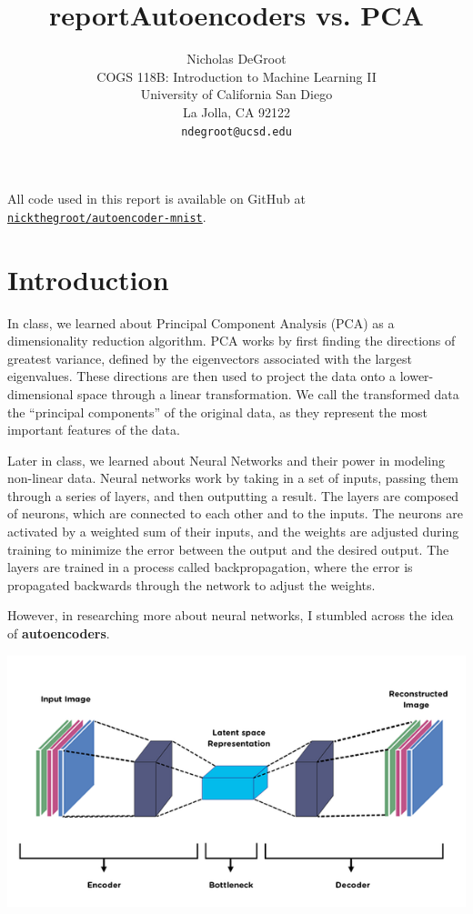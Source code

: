 \documentclass[11pt]{article}
\title{report}
\begin{document}
\title{Autoencoders vs. PCA}
\author{
    Nicholas DeGroot \\
    COGS 118B: Introduction to Machine Learning II \\
    University of California San Diego\\
    La Jolla, CA 92122 \\
    \texttt{ndegroot@ucsd.edu}
}


\maketitle


All code used in this report is available on GitHub at \href{https://github.com/nickthegroot/autoencoder-mnist}{\texttt{nickthegroot/autoencoder-mnist}}.

\hypertarget{introduction}{%
    \section{Introduction}\label{introduction}}

In class, we learned about Principal Component Analysis (PCA) as a
dimensionality reduction algorithm. PCA works by first finding the
directions of greatest variance, defined by the eigenvectors associated
with the largest eigenvalues. These directions are then used to project
the data onto a lower-dimensional space through a linear transformation.
We call the transformed data the ``principal components'' of the
original data, as they represent the most important features of the
data.

Later in class, we learned about Neural Networks and their power in
modeling non-linear data. Neural networks work by taking in a set of
inputs, passing them through a series of layers, and then outputting a
result. The layers are composed of neurons, which are connected to each
other and to the inputs. The neurons are activated by a weighted sum of
their inputs, and the weights are adjusted during training to minimize
the error between the output and the desired output. The layers are
trained in a process called backpropagation, where the error is
propagated backwards through the network to adjust the weights.

However, in researching more about neural networks, I stumbled across
the idea of \textbf{autoencoders}.

\includegraphics{./figures/autoencoder.png}
\end{document}
